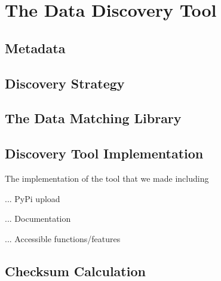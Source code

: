 \chapter{The Data Discovery Tool}\label{ch:ch2label}


\section{Metadata}



\section{Discovery Strategy}



\section{The Data Matching Library}



\section{Discovery Tool Implementation}
The implementation of the tool that we made including

... PyPi upload

... Documentation

... Accessible functions/features



\section{Checksum Calculation}


